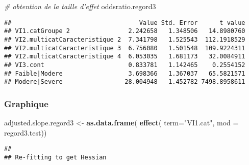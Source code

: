 \documentclass[
]{book}
\newenvironment{Shaded}{\begin{snugshade}}{\end{snugshade}}
\newcommand{\CommentTok}[1]{\textcolor[rgb]{0.56,0.35,0.01}{\textit{#1}}}
\newcommand{\DataTypeTok}[1]{\textcolor[rgb]{0.13,0.29,0.53}{#1}}
\newcommand{\KeywordTok}[1]{\textcolor[rgb]{0.13,0.29,0.53}{\textbf{#1}}}
\newcommand{\NormalTok}[1]{#1}
\newcommand{\StringTok}[1]{\textcolor[rgb]{0.31,0.60,0.02}{#1}}
\begin{document}
\begin{Shaded}
\begin{Highlighting}[]
\CommentTok{# obtention de la taille d'effet}
\NormalTok{oddsratio.regord3}
\end{Highlighting}
\end{Shaded}

\begin{verbatim}
##                                   Value Std. Error      t value
## VI1.catGroupe 2                2.242658   1.348506   14.8980760
## VI2.multicatCaracteristique 2  7.341798   1.525543  112.1918529
## VI2.multicatCaracteristique 3  6.756080   1.501548  109.9224311
## VI2.multicatCaracteristique 4  6.053035   1.681173   32.0084911
## VI3.cont                       0.833781   1.142465    0.2554152
## Faible|Modere                  3.698366   1.367037   65.5821571
## Modere|Severe                 28.004948   1.452782 7498.8958611
\end{verbatim}

\hypertarget{graphique-19}{%
\subsubsection{Graphique}\label{graphique-19}}

\begin{Shaded}
\begin{Highlighting}[]
\NormalTok{adjusted.slope.regord3 <-}\StringTok{ }\KeywordTok{as.data.frame}\NormalTok{(}
  \KeywordTok{effect}\NormalTok{(}
    \DataTypeTok{term=}\StringTok{"VI1.cat"}\NormalTok{, }
    \DataTypeTok{mod =}\NormalTok{ regord3.test))}
\end{Highlighting}
\end{Shaded}

\begin{verbatim}
## 
## Re-fitting to get Hessian
\end{verbatim}
\end{document}
